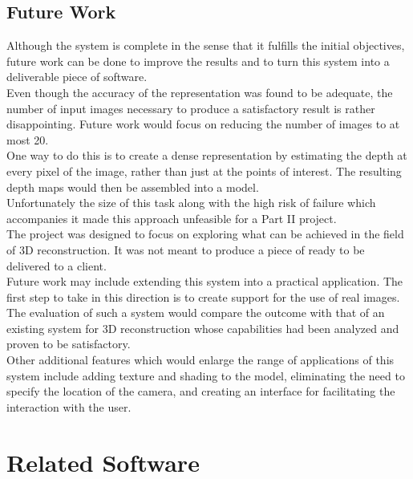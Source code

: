 \documentclass[12pt,a4paper,twoside,openright]{report}
\begin{document}
\section{Future Work}
Although the system is complete in the sense that it fulfills the initial objectives, future work can be done to improve the results and to turn this system into a deliverable piece of software. \\
\linebreak
Even though the accuracy of the representation was found to be adequate, the number of input images necessary to produce a satisfactory result is rather disappointing. Future work would focus on reducing the number of images to at most 20.\\ One way to do this is to create a dense representation by estimating the depth at every pixel of the image, rather than just at the points of interest. The resulting depth maps would then be assembled into a model.\\ Unfortunately the size of this task along with the high risk of failure which accompanies it made this approach unfeasible for a Part II project.\\
\linebreak
The project was designed to focus on exploring what can be achieved in the field of 3D reconstruction. It was not meant to produce a piece of  ready to be delivered to a client.\\ 
Future work may include extending this system into a practical application. 
The first step to take in this direction is to create support for the use of real images. The evaluation of such a system would compare the outcome with that of an existing system for 3D reconstruction whose capabilities had been analyzed and proven to be satisfactory.\\ 
Other additional features which would enlarge the range of applications of this system include adding texture and shading to the model, eliminating the need to specify the location of the camera, and creating an interface for facilitating the interaction with the user.




\appendix
\chapter{Related Software}
\end{document}
